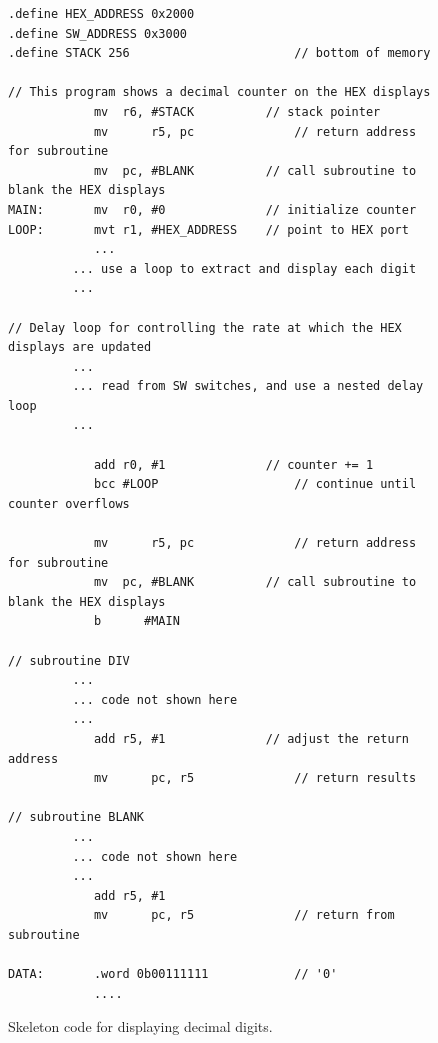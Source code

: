 \documentclass[epsfig,10pt,fullpage]{article}
\begin{document}
\lstset{language=ASM,numbers=none,escapechar=|}
\begin{figure}[H]
\begin{center}
\begin{minipage}[h]{15 cm}
\begin{lstlisting}[name=proc]
.define HEX_ADDRESS 0x2000
.define SW_ADDRESS 0x3000
.define STACK 256						// bottom of memory

// This program shows a decimal counter on the HEX displays
			mv 	r6, #STACK			// stack pointer
			mv		r5, pc				// return address for subroutine
			mv 	pc, #BLANK			// call subroutine to blank the HEX displays
MAIN:		mv 	r0, #0				// initialize counter
LOOP:		mvt	r1, #HEX_ADDRESS	// point to HEX port
			...
         ... use a loop to extract and display each digit
         ...

// Delay loop for controlling the rate at which the HEX displays are updated
         ...
         ... read from SW switches, and use a nested delay loop
         ...

			add	r0, #1				// counter += 1
			bcc	#LOOP					// continue until counter overflows

			mv		r5, pc				// return address for subroutine
			mv 	pc, #BLANK			// call subroutine to blank the HEX displays
			b 	   #MAIN

// subroutine DIV
         ...
         ... code not shown here
         ...
			add	r5, #1				// adjust the return address
			mv		pc, r5				// return results

// subroutine BLANK
         ...
         ... code not shown here
         ...
			add	r5, #1
			mv		pc, r5				// return from subroutine

DATA:		.word 0b00111111			// '0'
			....
\end{lstlisting}
\end{minipage}
\caption{Skeleton code for displaying decimal digits.}
\label{fig:part7}
\end{center}
\end{figure}
\end{document}
